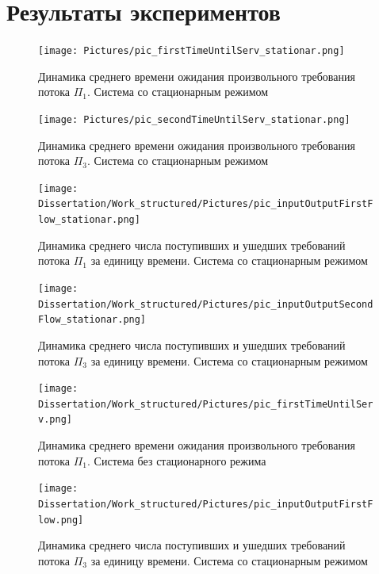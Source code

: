 

\chapter{Результаты экспериментов} \label{AppendixB}

\vspace{-1cm}
\begin{figure}[h]
\centering
\texttt{[image: Pictures/pic\_firstTimeUntilServ\_stationar.png]} 
\caption{Динамика среднего времени ожидания произвольного требования потока $\Pi_1$. Система со стационарным режимом}
\label{Experiment:timeUntilServiceFirst:stationar}
\end{figure}

\begin{figure}[h]
\centering
\texttt{[image: Pictures/pic\_secondTimeUntilServ\_stationar.png]} 
\caption{Динамика среднего времени ожидания произвольного требования потока $\Pi_3$. Система со стационарным режимом}
\label{Experiment:timeUntilServiceSecond:stationar}
\end{figure}

\begin{figure}[h]
\centering
\texttt{[image: Dissertation/Work\_structured/Pictures/pic\_inputOutputFirstFlow\_stationar.png]}
\caption{Динамика среднего числа поступивших и ушедших требований потока $\Pi_1$  за единицу времени. Система со стационарным режимом}
\label{Experiment:inputOutputFirstFlow:stationar}
\end{figure}

\begin{figure}[h]
\centering
\texttt{[image: Dissertation/Work\_structured/Pictures/pic\_inputOutputSecondFlow\_stationar.png]}
\caption{Динамика среднего числа поступивших и ушедших требований потока $\Pi_3$ за единицу времени. Система со стационарным режимом}
\label{Experiment:inputOutputSecondFlow:stationar}
\end{figure}

\begin{figure}[h]
\centering
\texttt{[image: Dissertation/Work\_structured/Pictures/pic\_firstTimeUntilServ.png]}
\caption{Динамика среднего времени ожидания произвольного требования потока $\Pi_1$. Система без стационарного режима}
\label{Experiment:timeUntilServiceSecond:nonstationar}
\end{figure}

\begin{figure}[h]
\centering
\texttt{[image: Dissertation/Work\_structured/Pictures/pic\_inputOutputFirstFlow.png]}
\caption{Динамика среднего числа поступивших и ушедших требований потока $\Pi_3$ за единицу времени. Система со стационарным режимом}
\label{Experiment:inputOutputFirstFlow}
\end{figure}


